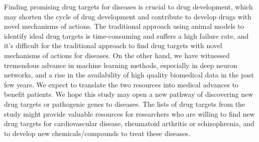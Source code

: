   Finding promising drug targets for diseases is crucial to drug development, which may shorten the cycle of drug development and contribute to develop drugs with novel mechanisms of actions. The traditional approach using animal models to identify ideal drug targets is time-consuming and suffers a high failure rate, and it's difficult for the traditional approach to find drug targets with novel mechanisms of actions for diseases. On the other hand, we have witnessed tremendous advance in machine learning methods, especially in deep neuron networks, and a rise in the availability of high quality biomedical data in the past few years. We expect to translate the two resources into medical advances to benefit patients. We hope this study may open a new pathway of discovering new drug targets or pathogenic genes to diseases. The lists of drug targets from the study might provide valuable resources for researchers who are willing to find new drug targets for cardiovascular disease, rheumatoid arthritis or schizophrenia, and to develop new chemicals/compounds to treat these diseases.

\chapterend